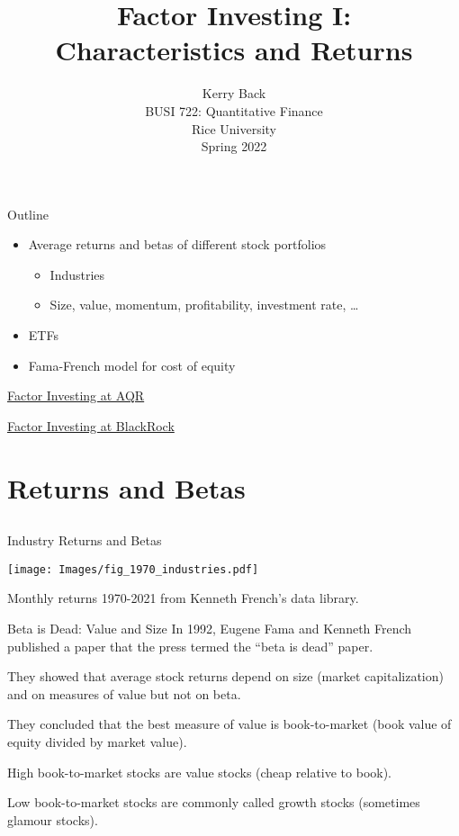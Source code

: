 \documentclass[xcolor=dvipsnames,10pt]{beamer}
\author{\vskip 0.5in \small Kerry Back \\BUSI 722: Quantitative Finance\\ Rice University \\Spring 2022}
\date[]
\begin{document}
\title{\vskip 0.5in Factor Investing I:\\ Characteristics and Returns}

\begin{frame}
  \titlepage
\end{frame}

\begin{frame}{Outline}
    \begin{itemize}
       \item Average returns and betas of different stock portfolios
       \begin{itemize}
           \item Industries
           \item Size, value, momentum, profitability, investment rate, \ldots
       \end{itemize}
       \item ETFs 
        \item Fama-French model for cost of equity
    \end{itemize}
    \begin{center}
\href{https://www.aqr.com/Learning-Center/Systematic-Equities/Systematic-Equities-A-Closer-Look?gclid=Cj0KCQiA_8OPBhDtARIsAKQu0gZS3uj9A0fdCN5eB_P-uUfY0VWr2uY9MW503bgPnO7DbQeVr2_WlxkaAlwhEALw_wcB}{Factor Investing at AQR}

\href{https://www.blackrock.com/us/individual/investment-ideas/what-is-factor-investing}{Factor Investing at BlackRock}
\end{center}
\end{frame}

\section{Returns and Betas}\subsection{}
\begin{frame}{Industry Returns and Betas}

    \begin{center}
        \texttt{[image: Images/fig\_1970\_industries.pdf]}
    \end{center}
    Monthly returns 1970-2021 from Kenneth French's data library.
\end{frame}

\begin{frame}{Beta is Dead: Value and Size}
 In 1992, Eugene Fama and Kenneth French published a paper that the press termed the ``beta is dead'' paper.
 
 They showed that average stock returns depend on size (market capitalization) and on measures of value but not on beta.
 
 They concluded that the best measure of value is book-to-market (book value of equity divided by market value).  
 
 High book-to-market stocks are value stocks (cheap relative to book).  
 
 Low book-to-market stocks are commonly called growth stocks (sometimes glamour stocks).
\end{frame}
\end{document}
